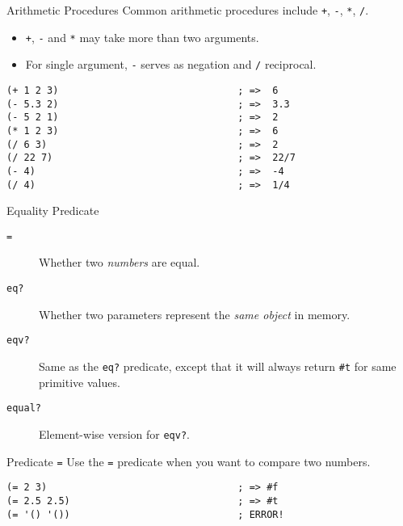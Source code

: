 \documentclass[presentation]{beamer}
\begin{document}
\begin{frame}[fragile,label={sec:orgheadline17}]{Arithmetic Procedures}
 Common arithmetic procedures include \texttt{+}, \texttt{-}, \texttt{*}, \texttt{/}.

\begin{itemize}
\item \texttt{+}, \texttt{-} and \texttt{*} may take more than two arguments.
\item For single argument, \texttt{-} serves as negation and \texttt{/} reciprocal.
\end{itemize}


\begin{verbatim}
(+ 1 2 3)                               ; =>  6
(- 5.3 2)                               ; =>  3.3
(- 5 2 1)                               ; =>  2
(* 1 2 3)                               ; =>  6
(/ 6 3)                                 ; =>  2
(/ 22 7)                                ; =>  22/7
(- 4)                                   ; =>  -4
(/ 4)                                   ; =>  1/4
\end{verbatim}
\end{frame}


\begin{frame}[fragile,label={sec:orgheadline18}]{Equality Predicate}
 \begin{description}
\item[{\texttt{=}}] Whether two \emph{numbers} are equal.
\item[{\texttt{eq?}}] Whether two parameters represent the \emph{same object} in
memory.
\item[{\texttt{eqv?}}] Same as the \texttt{eq?} predicate, except that it will always
return \texttt{\#t} for same primitive values.
\item[{\texttt{equal?}}] Element-wise version for \texttt{eqv?}.
\end{description}
\end{frame}

\begin{frame}[fragile,label={sec:orgheadline19}]{Predicate \texttt{=}}
 Use the \texttt{=} predicate when you want to compare two numbers.

\begin{verbatim}
(= 2 3)                                 ; => #f
(= 2.5 2.5)                             ; => #t
(= '() '())                             ; ERROR!
\end{verbatim}
\end{frame}
\end{document}
